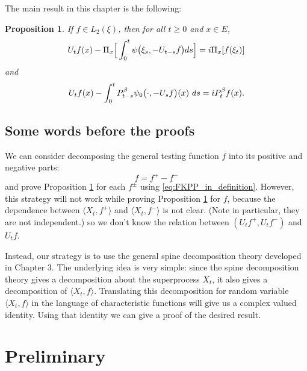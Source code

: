 \documentclass[UTF8]{pkuthss}
\theoremstyle{plain}
\newtheorem{prop}[thm]{Proposition}
\theoremstyle{definition}
\numberwithin{equation}{section}
\begin{document}
    The main result in this chapter is the following:
\begin{prop}
\label{prop: complex FKPP-equation}
    If $f\in L_2(\xi)$,  then for all $t\geq 0$ and $x\in E$,
\begin{equation}
\label{eq: complex FKPP-equation}
    U_tf(x) - \Pi_x \Big[\int_0^t \psi\big(\xi_s, - U_{t-s}f\big) ds \Big]
    \\= i \Pi_x [f(\xi_t)]
\end{equation}
    and
\begin{equation}
\label{eq: complex FKPP-equation with FK-transform}
    U_tf(x) -  \int_0^t P_{t-s}^{\beta} \psi_0\big(\cdot,-U_sf\big) (x)~ds
    \\= iP_t^{\beta} f(x).
\end{equation}
\end{prop}

\subsection{Some words before the proofs}
	We can consider decomposing the general testing function $f$ into its positive and negative parts:
\[
	f= f^+ -f^-
\]
	and prove Proposition \ref{prop: complex FKPP-equation} for each $f^\pm$ using \eqref{eq:FKPP_in_definition}.
	However, this strategy will not work while proving Proposition \ref{prop: complex FKPP-equation} for $f$, because the dependence between $\langle X_t,f^+\rangle$ and $\langle X_t,f^-\rangle $ is not clear. (Note in particular, they are not independent.) so we don't know the relation between $(U_tf^+,U_tf^-)$ and $U_tf$.

	Instead, our strategy is to use the general spine decomposition theory developed in Chapter 3. 
	The underlying idea is very simple: since the spine decomposition theory gives a decomposition about the superprocess $X_t$, it also gives a decomposition of $\langle X_t,f\rangle$. 
	Translating this decomposition for random variable $\langle X_t,f\rangle$ in the language of characteristic functions will give us a complex valued identity. 
	Using that identity we can give a proof of the desired result.

\section{Preliminary}
\end{document}
